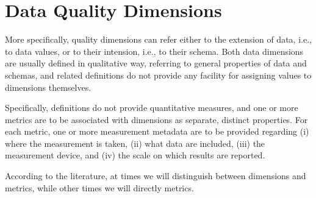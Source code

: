 \chapter{Data Quality Dimensions}

\ifpdf
    \graphicspath{{Chapter2/Figs/Raster/}{Chapter2/Figs/PDF/}{Chapter2/Figs/}}
\else
    \graphicspath{{Chapter2/Figs/Vector/}{Chapter2/Figs/}}
\fi

More specifically, quality dimensions can refer either to the extension of data, i.e., to data values, or to their 
intension, i.e., to their schema. Both data dimensions are usually defined in qualitative way, referring to general properties of data and schemas,
and related definitions do not provide any facility for assigning values to dimensions themselves. 

Specifically, definitions do not provide quantitative measures, and one or more metrics are to be associated with dimensions as separate, distinct 
properties. For each metric, one or more measurement metadata are to be provided regarding (i) where the measurement is taken, (ii) what data are included, 
(iii) the measurement device, and (iv) the scale on which results are reported.

According to the literature, at times we will distinguish between dimensions and metrics, while other times we will directly metrics.

